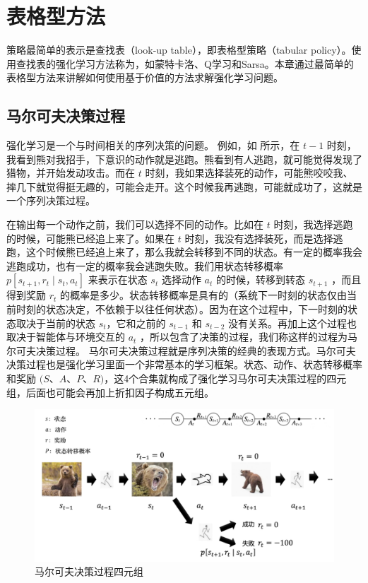 \section{表格型方法}
策略最简单的表示是查找表（look-up table），即表格型策略（tabular policy）。使用查找表的强化学习方法称为，如蒙特卡洛、Q学习和Sarsa。本章通过最简单的表格型方法来讲解如何使用基于价值的方法求解强化学习问题。

\subsection{马尔可夫决策过程}

强化学习是一个与时间相关的序列决策的问题。
例如，如 所示，在 $t-1$ 时刻，我看到熊对我招手，下意识的动作就是逃跑。熊看到有人逃跑，就可能觉得发现了猎物，并开始发动攻击。而在 $t$ 时刻，我如果选择装死的动作，可能熊咬咬我、摔几下就觉得挺无趣的，可能会走开。这个时候我再逃跑，可能就成功了，这就是一个序列决策过程。

在输出每一个动作之前，我们可以选择不同的动作。比如在 $t$ 时刻，我选择逃跑的时候，可能熊已经追上来了。如果在 $t$ 时刻，我没有选择装死，而是选择逃跑，这个时候熊已经追上来了，那么我就会转移到不同的状态。有一定的概率我会逃跑成功，也有一定的概率我会逃跑失败。我们用状态转移概率 $p\left[s_{t+1}, r_{t} \mid s_{t}, a_{t}\right]$ 来表示在状态 $s_t$ 选择动作 $a_t$ 的时候，转移到转态 $s_{t+1}$ ，而且得到奖励 $r_t$ 的概率是多少。状态转移概率是具有的（系统下一时刻的状态仅由当前时刻的状态决定，不依赖于以往任何状态）。因为在这个过程中，下一时刻的状态取决于当前的状态 $s_t$，它和之前的 $s_{t-1}$ 和 $s_{t-2}$ 没有关系。再加上这个过程也取决于智能体与环境交互的 $a_t$ ，所以包含了决策的过程，我们称这样的过程为马尔可夫决策过程。
马尔可夫决策过程就是序列决策的经典的表现方式。马尔可夫决策过程也是强化学习里面一个非常基本的学习框架。状态、动作、状态转移概率和奖励 $(S$、$A$、$P$、$R)$，这4个合集就构成了强化学习马尔可夫决策过程的四元组，后面也可能会再加上折扣因子构成五元组。

\begin{figure}[htb]
	\centering
	\includegraphics[width=0.5\linewidth]{res/ch3/3.1}
	\caption{马尔可夫决策过程四元组}
	\label{fig:fig3.1}
\end{figure}

